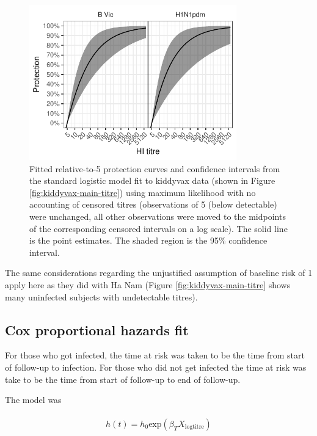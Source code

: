 \documentclass[12pt]{article}
\begin{document}
\begin{figure}[htp]
	\centering
	\includegraphics[width=0.8\textwidth]{../fit-logistic-boot-plot/kiddyvaxmain-prot-rel.pdf}
	\caption{
	Fitted relative-to-5 protection curves and confidence intervals from the standard logistic model fit to kiddyvax data (shown in Figure \ref{fig:kiddyvax-main-titre}) using maximum likelihood with no accounting of censored titres (observations of 5 (below detectable) were unchanged, all other observations were moved to the midpoints of the corresponding censored intervals on a log scale). The solid line is the point estimates. The shaded region is the 95\% confidence interval.
	}
	\label{fig:kiddyvaxmain-prot-rel-lr-boot}
\end{figure}

The same considerations regarding the unjustified assumption of baseline risk of 1 apply here as they did with Ha Nam (Figure \ref{fig:kiddyvax-main-titre} shows many uninfected subjects with undetectable titres).

\pagebreak
\subsection{Cox proportional hazards fit}

For those who got infected, the time at risk was taken to be the time from start of follow-up to infection. For those who did not get infected the time at risk was take to be the time from start of follow-up to end of follow-up.

The model was

\begin{align*}
\begin{gathered}
h(t) = h_0\text{exp}(\beta_T X_{\text{logtitre}})
\end{gathered}
\end{align*}
\end{document}
